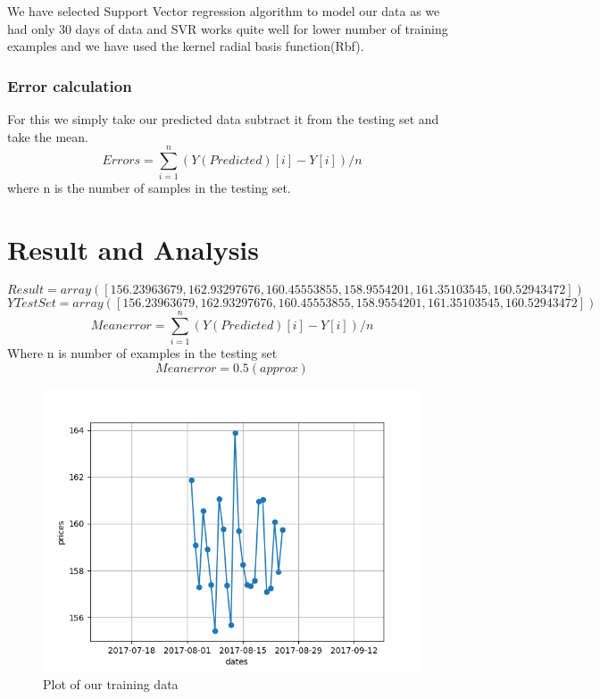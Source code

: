 \documentclass{report}
\begin{document}
We have selected Support Vector regression algorithm to model our data as we had only 30 days of data and SVR works quite well for lower number of training examples and we have used the kernel radial basis function(Rbf). 
\newpage
\subsection{Error calculation}

For this we simply take our predicted data subtract it from the testing set and take the mean.
$$Errors=\sum_{i=1}^{n} (Y(Predicted)[i] - Y[i])/n$$
where n is the number of samples in the testing set.

\chapter{Result and Analysis}
	$$Result = array([ 156.23963679,  162.93297676,  160.45553855,  158.9554201 ,
        161.35103545,  160.52943472])$$
    $$YTestSet = array([ 156.23963679,  162.93297676,  160.45553855,  158.9554201 ,
        161.35103545,  160.52943472])$$
    $$Mean error=\sum_{i=1}^{n} (Y(Predicted)[i] - Y[i])/n$$
    Where n is  number of examples in the testing set    
	$$Mean error = 0.5(approx)$$
	\begin{figure}[H]
 	\includegraphics[width=\linewidth]{figure_1-1.png}
 	\caption{Plot of our training data}
	\end{figure}
\end{document}

